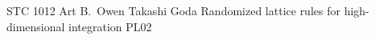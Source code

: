 	{STC 1012}	%
	{Art B.\ Owen}		%
	{Takashi Goda}	%
	{Randomized lattice rules for high-dimensional integration}		%
	{PL02}			%
 \\
